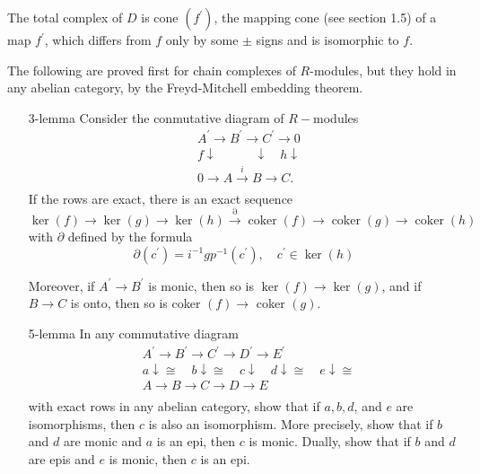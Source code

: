 \begin{example}
\begin{prop}
\begin{enumerate}
        The total complex of $D$ is cone $\left(f^{\prime}\right)$, the mapping cone (see section 1.5) of a map $f^{\prime}$, which differs from $f$ only by some $\pm$ signs and is isomorphic to $f$.
    \end{enumerate}
\end{prop}



\begin{prop}The following are proved first for chain complexes of $R$-modules, but they hold in any abelian category, by the Freyd-Mitchell embedding theorem.
    \begin{enumerate}
      \item[3-lemma] Consider the conmutative diagram of $R-$modules
       $$\begin{aligned} & A^{\prime} \longrightarrow B^{\prime} \longrightarrow C^{\prime} \longrightarrow 0 \\ & f \downarrow \quad \quad \quad \downarrow \quad h \downarrow \\ & 0 \longrightarrow A \xrightarrow{i} B \longrightarrow C . \\ & \end{aligned}$$ If the rows are exact, there is an exact sequence
       $$
       \operatorname{ker}(f) \rightarrow \operatorname{ker}(g) \rightarrow \operatorname{ker}(h) \xrightarrow{\partial} \operatorname{coker}(f) \rightarrow \operatorname{coker}(g) \rightarrow \operatorname{coker}(h)
       $$
       with $\partial$ defined by the formula
       $$
       \partial\left(c^{\prime}\right)=i^{-1} g p^{-1}\left(c^{\prime}\right), \quad c^{\prime} \in \operatorname{ker}(h)
       $$
       
       Moreover, if $A^{\prime} \rightarrow B^{\prime}$ is monic, then so is $\operatorname{ker}(f) \rightarrow \operatorname{ker}(g)$, and if $B \rightarrow C$ is onto, then so is coker $(f) \rightarrow$ coker $(g)$.
  
       \item[5-lemma] In any commutative diagram
       $$
       \begin{aligned}
       & A^{\prime} \longrightarrow B^{\prime} \longrightarrow C^{\prime} \longrightarrow D^{\prime} \longrightarrow E^{\prime} \\
       & a \downarrow \cong \quad b \downarrow \cong \quad c \downarrow \quad d \downarrow \cong \quad e \downarrow \cong \\
       & A \longrightarrow B \longrightarrow C \longrightarrow D \longrightarrow E \\
       &
       \end{aligned}
       $$
       with exact rows in any abelian category, show that if $a, b, d$, and $e$ are isomorphisms, then $c$ is also an isomorphism. More precisely, show that if $b$ and $d$ are monic and $a$ is an epi, then $c$ is monic. Dually, show that if $b$ and $d$ are epis and $e$ is monic, then $c$ is an epi.
    \end{enumerate}  
  \end{prop}
  

\end{example}
